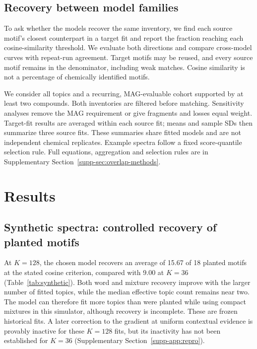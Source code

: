 \documentclass[10pt,a4paper]{article}
\begin{document}
\subsection{Recovery between model families}
\label{sec:overlap-methods}

To ask whether the models recover the same inventory, we find each source
motif's closest counterpart in a target fit and report the fraction reaching
each cosine-similarity threshold. We evaluate both directions and compare
cross-model curves with repeat-run agreement. Target motifs may be reused,
and every source motif remains in the denominator, including weak matches.
Cosine similarity is not a percentage of chemically identified motifs.

We consider all topics and a recurring, MAG-evaluable cohort supported by at
least two compounds. Both inventories are filtered before matching. Sensitivity
analyses remove the MAG requirement or give fragments and losses equal weight.
Target-fit results are averaged within each source fit; means and sample SDs
then summarize three source fits. These summaries share fitted models and
are not independent chemical replicates. Example spectra follow a fixed
score-quantile selection rule. Full equations, aggregation and selection
rules are in Supplementary Section~\ref{supp-sec:overlap-methods}.

\section{Results}

\subsection{Synthetic spectra: controlled recovery of planted motifs}

At $K=128$, the chosen model recovers an average of 15.67 of 18 planted
motifs at the stated cosine criterion, compared with 9.00 at $K=36$
(Table~\ref{tab:synthetic}). Both word and mixture recovery improve with
the larger number of fitted topics, while the median effective topic count
remains near two. The model can therefore fit more topics than were planted
while using compact mixtures in this simulator, although recovery is incomplete.
These are frozen historical fits. A later correction to the gradient at
uniform contextual evidence is provably inactive for these $K=128$ fits,
but its inactivity has not been established for $K=36$
(Supplementary Section~\ref{supp-app:repro}).
\end{document}
